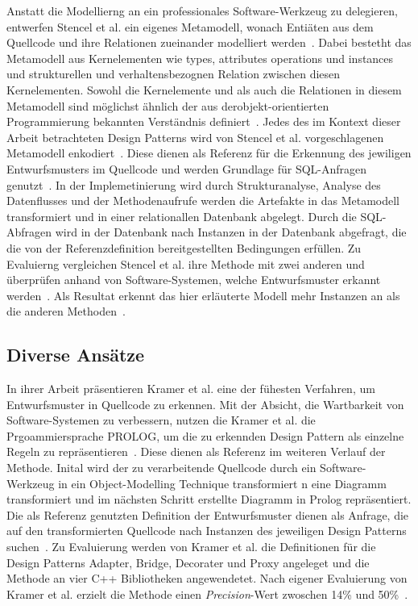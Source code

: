 Anstatt die Modellierng an ein professionales Software-Werkzeug zu delegieren, entwerfen Stencel et al. ein eigenes Metamodell, wonach Entiäten aus dem Quellcode und ihre Relationen zueinander modelliert werden~\cite[S. 27]{stencel-2008}.
Dabei bestetht das Metamodell aus Kernelementen wie types, attributes operations und instances und strukturellen und verhaltensbezognen Relation zwischen diesen Kernelementen. Sowohl die Kernelemente und als auch die Relationen in diesem Metamodell sind möglichst ähnlich der aus derobjekt-orientierten Programmierung bekannten Verständnis definiert~\cite[S. 27]{stencel-2008}.
Jedes des im Kontext dieser Arbeit betrachteten Design Patterns wird von Stencel et al. vorgeschlagenen Metamodell enkodiert~\cite[S.28 - 29]{stencel-2008}. Diese dienen als Referenz für die Erkennung des jewiligen Entwurfsmusters im Quellcode und werden Grundlage für SQL-Anfragen genutzt~\cite[S. 29]{stencel-2008}.
In der Implemetinierung wird durch Strukturanalyse, Analyse des Datenflusses und der Methodenaufrufe werden die Artefakte in das Metamodell transformiert und in einer relationallen Datenbank abgelegt.
Durch die SQL-Abfragen wird in der Datenbank nach Instanzen in der Datenbank abgefragt, die die von der Referenzdefinition bereitgestellten Bedingungen erfüllen.
Zu Evaluierng vergleichen Stencel et al. ihre Methode mit zwei anderen und überprüfen anhand von Software-Systemen, welche Entwurfsmuster erkannt werden~\cite[S. 30]{stencel-2008}.
Als Resultat erkennt das hier erläuterte Modell mehr Instanzen an als die anderen Methoden~\cite[S. 29]{stencel-2008}.

\subsection{Diverse Ansätze}

In ihrer Arbeit präsentieren Kramer et al. eine der fühesten Verfahren, um Entwurfsmuster in Quellcode zu erkennen.
Mit der Absicht, die Wartbarkeit von Software-Systemen zu verbessern, nutzen die Kramer et al. die Prgoammiersprache PROLOG, um 
die zu erkennden Design Pattern als einzelne Regeln zu repräsentieren~\cite[S. 2]{Krammer-1996}. Diese dienen als Referenz im weiteren Verlauf der Methode.
Inital wird der zu verarbeitende Quellcode durch ein Software-Werkzeug in ein Object-Modelling Technique transformiert n eine Diagramm transformiert und im nächsten Schritt erstellte Diagramm in Prolog repräsentiert.
Die als Referenz genutzten Definition der Entwurfsmuster dienen als Anfrage, die auf den transformierten Quellcode nach Instanzen des jeweiligen Design Patterns suchen~\cite[S. 2]{Krammer-1996}.
Zu Evaluierung werden von Kramer et al. die Definitionen für die Design Patterns Adapter, Bridge, Decorater und Proxy angeleget und die Methode an vier C++ Bibliotheken angewendetet.
Nach eigener Evaluierung von Kramer et al. erzielt die Methode einen \textit{Precision}-Wert zwoschen 14\% und 50\%~\cite[S. 7]{Krammer-1996}.

